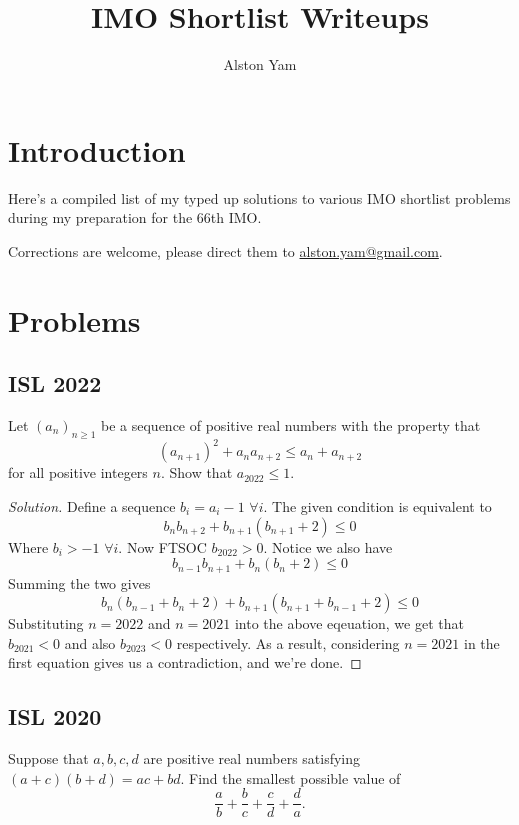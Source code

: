 \documentclass{article}
\date{}
\title{IMO Shortlist Writeups}
\author{Alston Yam}
\theoremstyle{mytheoremstyle}
\theoremstyle{mytheoremstyle}
\theoremstyle{myproblemstyle}
\begin{document}
    \maketitle
    \section{Introduction}
    Here's a compiled list of my typed up solutions to various IMO shortlist problems during my preparation for the 66th IMO. 

    Corrections are welcome, please direct them to \url{alston.yam@gmail.com}.
    
    \section{Problems}
    \subsection{ISL 2022}

    \begin{problem}[2022 A1]
        Let $(a_n)_{n\geq 1}$ be a sequence of positive real numbers with the property that
            \[ (a_{n+1})^2 + a_na_{n+2} \leq a_n + a_{n+2} \]
        for all positive integers $n$. Show that $a_{2022}\leq 1$.
    \end{problem}

    \begin{proof}[Solution]
        Define a sequence $b_i = a_i - 1$ $\forall i$. The given condition is equivalent to \[b_nb_{n+2} + b_{n+1}(b_{n+1} + 2) \leq 0\]
        Where $b_i > -1$ $\forall i$. Now FTSOC $b_{2022} > 0$. Notice we also have \[b_{n-1}b_{n+1} + b_{n}(b_{n} + 2) \leq 0\]
        Summing the two gives
        \[b_n(b_{n-1} + b_n + 2) + b_{n+1}(b_{n+1} + b_{n-1} + 2)\leq 0\]
        Substituting $n=2022$ and $n=2021$ into the above eqeuation, we get that $b_{2021} < 0$ and also $b_{2023} < 0$ respectively. As a result, considering $n=2021$ in the first equation gives us a contradiction, and we're done.
    \end{proof}

    \subsection{ISL 2020}

    \begin{problem}[2020 A3]
        Suppose that $a,b,c,d$ are positive real numbers satisfying $(a+c)(b+d)=ac+bd$. Find the smallest possible value of
        \[ \frac{a}{b}+\frac{b}{c}+\frac{c}{d}+\frac{d}{a}. \]
    \end{problem}
\end{document}
